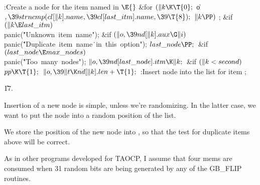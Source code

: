 \B{}:Create a node for the item named in \X${}\E{}$\6
\&{for} ${}(\|k\K\T{0};{}$ \|o${},\39\\{strncmp}(\\{cl}[\|k].\\{name},\39%
\\{cl}[\\{last\_itm}].\\{name},\39\T{8});{}$ ${}\|k\PP){}$\1\5
;\2\6
\&{if} ${}(\|k\E\\{last\_itm}){}$\1\5
\\{panic}(\.{"Unknown\ item\ name"});\2\6
\&{if} ${}(\|o,\39\\{nd}[\|k].\\{aux}\G\|i){}$\1\5
\\{panic}(\.{"Duplicate\ item\ name}\)\.{\ in\ this\ option"});\2\6
${}\\{last\_node}\PP;{}$\6
\&{if} ${}(\\{last\_node}\E\\{max\_nodes}){}$\1\5
\\{panic}(\.{"Too\ many\ nodes"});\2\6
${}\|o,\39\\{nd}[\\{last\_node}].\\{itm}\K\|k;{}$\6
\&{if} ${}(\|k<\\{second}){}$\1\5
${}\\{pp}\K\T{1};{}$\2\6
${}\|o,\39\|t\K\\{nd}[\|k].\\{len}+\T{1};{}$\6
:Insert node  into the list for item \X;\par
\U17.\fi

Insertion of a new node is simple, unless we're randomizing.
In the latter case, we want to put the node into a random position
of the list.

We store the position of the new node into , so that
the test for duplicate items above will be correct.

As in other programs developed for TAOCP, I assume that four mems are
consumed when 31 random bits are being generated by any of the {\mc GB\_FLIP}
routines.

